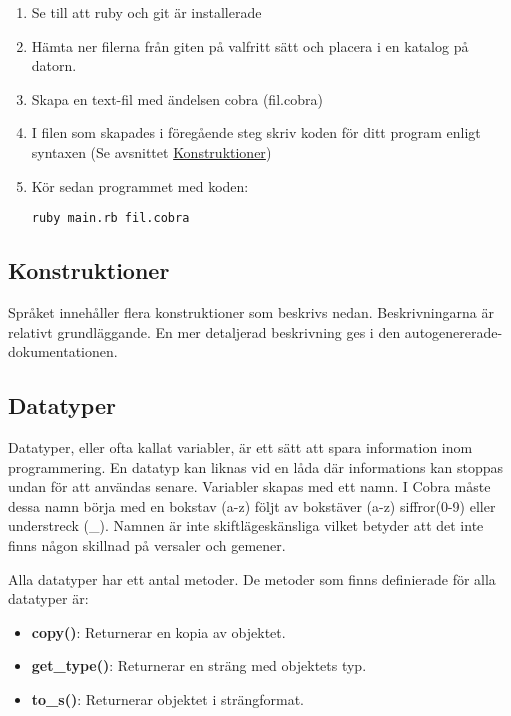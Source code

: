 \documentclass{TDP003mall}
\begin{document}
\begin{enumerate}
  \item Se till att ruby och git är installerade
  \item Hämta ner filerna från giten på valfritt sätt och placera i en katalog på datorn.
  \item Skapa en text-fil med ändelsen cobra (fil.cobra)
  \item I filen som skapades i föregående steg skriv koden för ditt program enligt syntaxen (Se avsnittet \hyperref[sec:Konstruktioner]{Konstruktioner})
  \item Kör sedan programmet med koden:
\begin{lstlisting}[caption=Kommando för att köra språket på en fil, label=lst:run_lang]
ruby main.rb fil.cobra
\end{lstlisting}
  
\end{enumerate}

\subsection{Konstruktioner}
\label{sec:Konstruktioner}
Språket innehåller flera konstruktioner som beskrivs nedan.
Beskrivningarna är relativt grundläggande. En mer detaljerad beskrivning ges i den autogenererade-dokumentationen. 

\subsection{Datatyper}
\label{sec:data_type_method}
Datatyper, eller ofta kallat variabler, är ett sätt att spara information inom programmering. En datatyp kan liknas vid en låda där informations kan stoppas undan för att användas senare. Variabler skapas med ett namn. I Cobra måste dessa namn börja med en bokstav (a-z) följt av bokstäver (a-z) siffror(0-9) eller understreck (\_). Namnen är inte skiftlägeskänsliga vilket betyder att det inte finns någon skillnad på versaler och gemener.

Alla datatyper har ett antal metoder. 
De metoder som finns definierade för alla datatyper är:
\begin{itemize}
    \item \textbf{copy()}: Returnerar en kopia av objektet.
    \item \textbf{get\_type()}: Returnerar en sträng med objektets typ.
    \item \textbf{to\_s()}: Returnerar objektet i strängformat.
\end{itemize}
\end{document}
